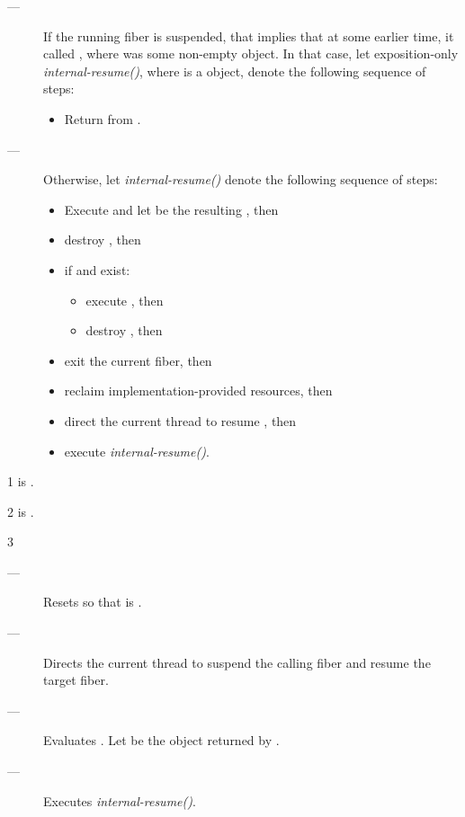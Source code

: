 \begin{description}
    \item[---]
          If the running fiber is suspended, that implies that at some earlier
          time, it called \resumewith[other], where  was some
          non-empty \fiber object. In that case, let
          exposition-only \emph{internal-resume()},
          where  is a \fiber object, denote the following sequence
          of steps:
        \begin{itemize}
            \item Return  from \resumewith[other].
        \end{itemize}   
    \item[---] Otherwise, let \emph{internal-resume()}
          denote the following sequence of steps:
        \begin{itemize}
            \item Execute
                  and let  be the resulting \fiber, then
            \item destroy , then
            \item if  and  exist:
                \begin{itemize}
                    \item execute , then
                    \item destroy , then
                \end{itemize}
            \item exit the current fiber, then
            \item reclaim implementation-provided resources, then
            \item direct the current thread to resume , then
            \item execute \emph{internal-resume()}.
        \end{itemize}
\end{description}

1 \mandates
{} is \true.

2 \precond
\canresume is \true.

3 \effects
\begin{description}
    \item[---] Resets \state so that \emptyfn is \true.
    \item[---] Directs the current thread to suspend the calling fiber and resume
               the target fiber.
    \item[---] Evaluates .
               Let  be the \fiber object returned by .
    \item[---] Executes \emph{internal-resume()}.
\end{description}

